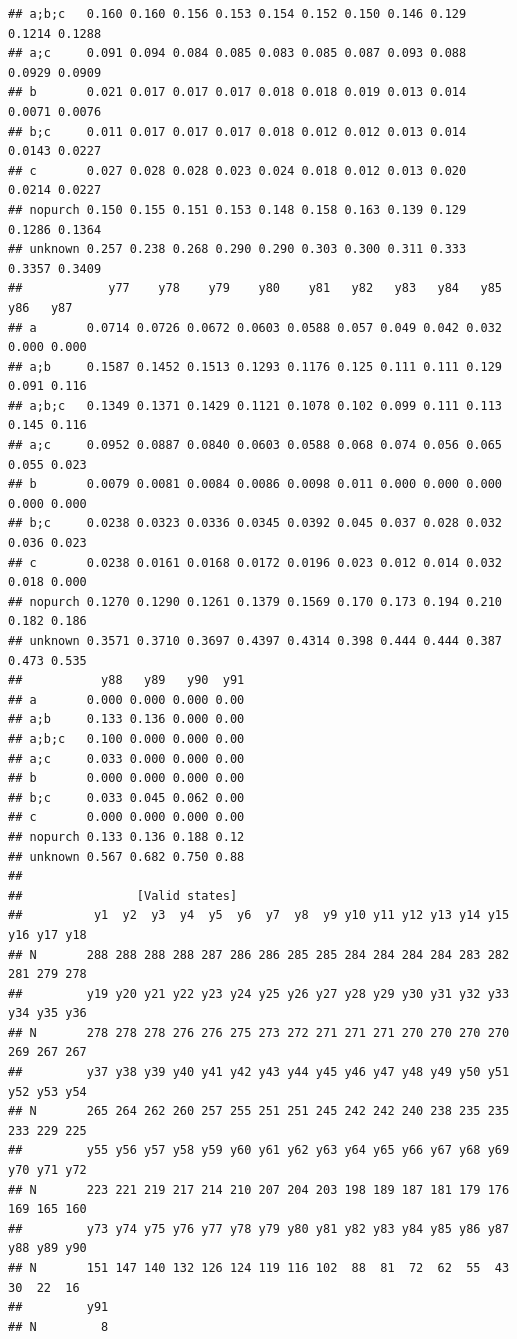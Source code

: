 \documentclass[
]{book}
\begin{document}
\begin{verbatim}
## a;b;c   0.160 0.160 0.156 0.153 0.154 0.152 0.150 0.146 0.129 0.1214 0.1288
## a;c     0.091 0.094 0.084 0.085 0.083 0.085 0.087 0.093 0.088 0.0929 0.0909
## b       0.021 0.017 0.017 0.017 0.018 0.018 0.019 0.013 0.014 0.0071 0.0076
## b;c     0.011 0.017 0.017 0.017 0.018 0.012 0.012 0.013 0.014 0.0143 0.0227
## c       0.027 0.028 0.028 0.023 0.024 0.018 0.012 0.013 0.020 0.0214 0.0227
## nopurch 0.150 0.155 0.151 0.153 0.148 0.158 0.163 0.139 0.129 0.1286 0.1364
## unknown 0.257 0.238 0.268 0.290 0.290 0.303 0.300 0.311 0.333 0.3357 0.3409
##            y77    y78    y79    y80    y81   y82   y83   y84   y85   y86   y87
## a       0.0714 0.0726 0.0672 0.0603 0.0588 0.057 0.049 0.042 0.032 0.000 0.000
## a;b     0.1587 0.1452 0.1513 0.1293 0.1176 0.125 0.111 0.111 0.129 0.091 0.116
## a;b;c   0.1349 0.1371 0.1429 0.1121 0.1078 0.102 0.099 0.111 0.113 0.145 0.116
## a;c     0.0952 0.0887 0.0840 0.0603 0.0588 0.068 0.074 0.056 0.065 0.055 0.023
## b       0.0079 0.0081 0.0084 0.0086 0.0098 0.011 0.000 0.000 0.000 0.000 0.000
## b;c     0.0238 0.0323 0.0336 0.0345 0.0392 0.045 0.037 0.028 0.032 0.036 0.023
## c       0.0238 0.0161 0.0168 0.0172 0.0196 0.023 0.012 0.014 0.032 0.018 0.000
## nopurch 0.1270 0.1290 0.1261 0.1379 0.1569 0.170 0.173 0.194 0.210 0.182 0.186
## unknown 0.3571 0.3710 0.3697 0.4397 0.4314 0.398 0.444 0.444 0.387 0.473 0.535
##           y88   y89   y90  y91
## a       0.000 0.000 0.000 0.00
## a;b     0.133 0.136 0.000 0.00
## a;b;c   0.100 0.000 0.000 0.00
## a;c     0.033 0.000 0.000 0.00
## b       0.000 0.000 0.000 0.00
## b;c     0.033 0.045 0.062 0.00
## c       0.000 0.000 0.000 0.00
## nopurch 0.133 0.136 0.188 0.12
## unknown 0.567 0.682 0.750 0.88
## 
##                [Valid states]
##          y1  y2  y3  y4  y5  y6  y7  y8  y9 y10 y11 y12 y13 y14 y15 y16 y17 y18
## N       288 288 288 288 287 286 286 285 285 284 284 284 284 283 282 281 279 278
##         y19 y20 y21 y22 y23 y24 y25 y26 y27 y28 y29 y30 y31 y32 y33 y34 y35 y36
## N       278 278 278 276 276 275 273 272 271 271 271 270 270 270 270 269 267 267
##         y37 y38 y39 y40 y41 y42 y43 y44 y45 y46 y47 y48 y49 y50 y51 y52 y53 y54
## N       265 264 262 260 257 255 251 251 245 242 242 240 238 235 235 233 229 225
##         y55 y56 y57 y58 y59 y60 y61 y62 y63 y64 y65 y66 y67 y68 y69 y70 y71 y72
## N       223 221 219 217 214 210 207 204 203 198 189 187 181 179 176 169 165 160
##         y73 y74 y75 y76 y77 y78 y79 y80 y81 y82 y83 y84 y85 y86 y87 y88 y89 y90
## N       151 147 140 132 126 124 119 116 102  88  81  72  62  55  43  30  22  16
##         y91
## N         8

\end{verbatim}
\end{document}
